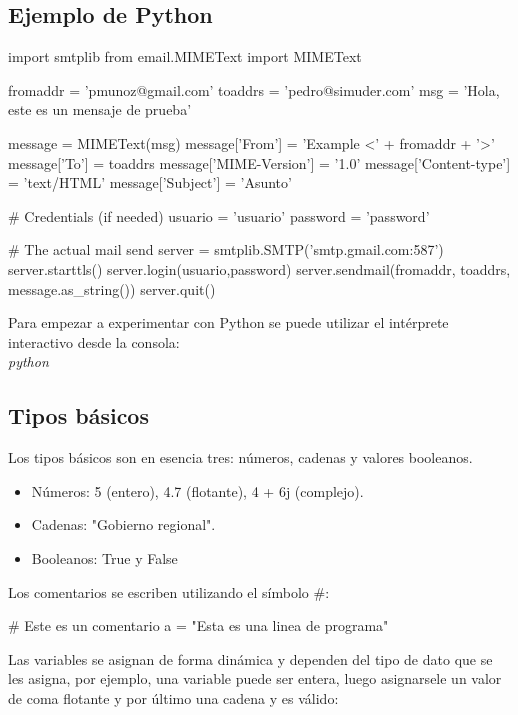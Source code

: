 \subsection{Ejemplo de Python}

\begin{pyglist}[language=python]
import smtplib
from email.MIMEText import MIMEText

fromaddr = 'pmunoz@gmail.com'
toaddrs  = 'pedro@simuder.com'
msg = 'Hola, este es un mensaje de prueba'

message = MIMEText(msg)
message['From'] = 'Example <' + fromaddr  + '>'
message['To'] = toaddrs
message['MIME-Version'] = '1.0'
message['Content-type'] = 'text/HTML'
message['Subject'] = 'Asunto'

# Credentials (if needed)  
usuario = 'usuario'
password = 'password'

# The actual mail send  
server = smtplib.SMTP('smtp.gmail.com:587')
server.starttls()
server.login(usuario,password)
server.sendmail(fromaddr, toaddrs, message.as_string())
server.quit()
\end{pyglist}


Para empezar a experimentar con Python se puede utilizar el intérprete interactivo desde la consola:\\

\emph{python}\\


\subsection{Tipos básicos}

Los tipos básicos son en esencia tres: números, cadenas y valores booleanos.

\begin{itemize}
\item Números: 5 (entero), 4.7 (flotante), 4 + 6j (complejo).
\item Cadenas: "Gobierno regional".
\item Booleanos: True y False
\end{itemize}

Los comentarios se escriben utilizando el símbolo \#:\\

\begin{pyglist} [language=python]
\# Este es un comentario
a = "Esta es una linea de programa"
\end{pyglist}

Las variables se asignan de forma dinámica y dependen del tipo de dato que se les asigna, por ejemplo, una variable puede ser entera, luego asignarsele un valor de coma flotante y por último una cadena y es válido:\\


